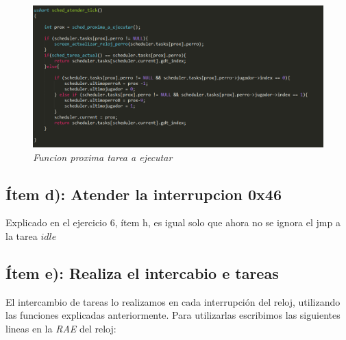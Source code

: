 \begin{figure}[H]
\begin{center}
\includegraphics[width=\linewidth]{ejercicio7/atendtick.png}
\caption{{\small \textit{Funcion proxima tarea a ejecutar }}}
\endminipage
\end{center}
\end{figure}

\subsection{Ítem d):  Atender la interrupcion 0x46}

Explicado en el ejercicio 6, ítem h, es igual solo que ahora no se ignora el jmp a la tarea $idle$

\subsection{Ítem e):  Realiza el intercabio e tareas}

El intercambio de tareas lo realizamos en cada interrupción del reloj, utilizando las funciones explicadas anteriormente. Para utilizarlas escribimos las siguientes lineas en la \textit{RAE} del reloj:

